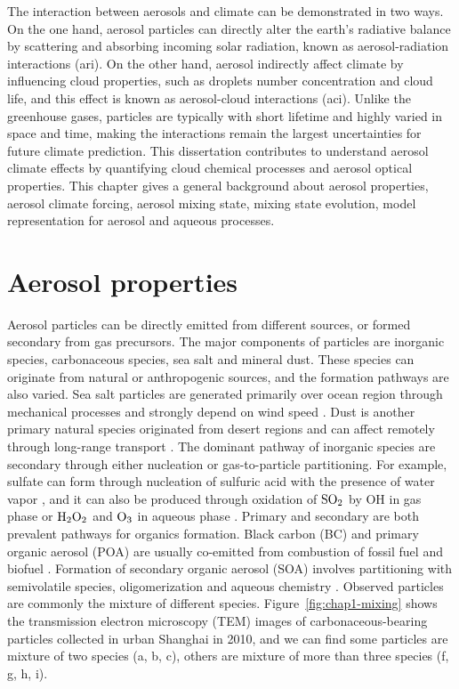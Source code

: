\documentclass[edeposit,fullpage]{uiucthesis2009}
\begin{document}
The interaction between aerosols and climate can be demonstrated in two ways. On the one hand, aerosol particles can directly alter the earth's radiative balance by scattering and absorbing incoming solar radiation, known as aerosol-radiation interactions (ari). On the other hand, aerosol indirectly affect climate by influencing cloud properties, such as droplets number concentration and cloud life, and this effect is known as aerosol-cloud interactions (aci). Unlike the greenhouse gases, particles are typically with short lifetime and highly varied in space and time, making the interactions remain the largest uncertainties for future climate prediction. This dissertation contributes to understand aerosol climate effects by quantifying cloud chemical processes and aerosol optical properties. This chapter gives a general background about aerosol properties, aerosol climate forcing, aerosol mixing state, mixing state evolution, model representation for aerosol and aqueous processes.  

\section{Aerosol properties}
\label{cha1-1:aerosol-defi}
Aerosol particles can be directly emitted from different sources, or formed secondary from gas precursors. The major components of particles are inorganic species, carbonaceous species, sea salt and mineral dust. These species can originate from natural or anthropogenic sources, and the formation pathways are also varied. Sea salt particles are generated primarily over ocean region through mechanical processes and strongly depend on wind speed \citep{jaegle2011global, monahan1986model}. Dust is another primary natural species originated from desert regions and can affect remotely through long-range transport \citep{van2018mysterious,yu2021observation}. The dominant pathway of inorganic species are secondary through either nucleation or gas-to-particle partitioning. For example, sulfate can form through nucleation of sulfuric acid with the presence of water vapor \citep{sipila2010role}, and it can also be produced through oxidation of $\rm SO_2$ by OH in gas phase or $\rm H_2O_2$ and $\rm O_3$ in aqueous phase \citep{shao2019heterogeneous, zheng2020multiphase}. Primary and secondary are both prevalent pathways for organics formation. Black carbon (BC) and primary organic aerosol (POA) are usually co-emitted from combustion of fossil fuel and biofuel \citep{bond2007historical}. Formation of secondary organic aerosol (SOA) involves partitioning with semivolatile species, oligomerization and aqueous chemistry \citep{zhu2017mechanism, lim2010aqueous, griffin2013sources, mcneill2015aqueous}. Observed particles are commonly the mixture of different species. 
Figure~\ref{fig:chap1-mixing} shows the transmission electron microscopy (TEM) images of carbonaceous-bearing particles collected in urban Shanghai in 2010, and we can find some particles are mixture of two species (a, b, c), others are mixture of more than three species (f, g, h, i).  
\end{document}
